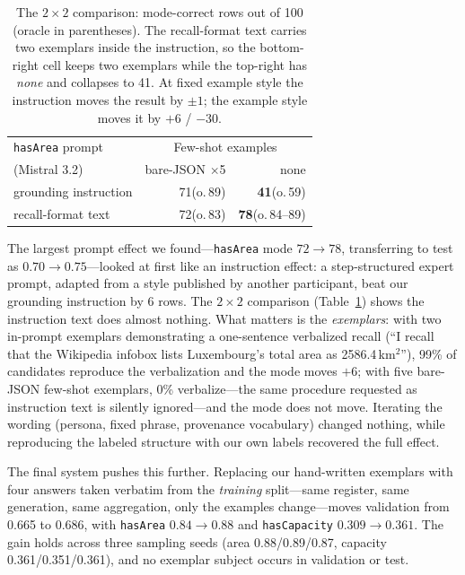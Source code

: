 \documentclass[11pt]{article}
\begin{document}
\begin{table}[t]
\centering
\footnotesize
\setlength{\tabcolsep}{4pt}
\begin{tabular}{lrr}
\toprule
\texttt{hasArea} prompt & \multicolumn{2}{c}{Few-shot examples} \\
(Mistral 3.2) & bare-JSON $\times$5 & none \\
\midrule
grounding instruction & 71\;(o.\,89) & \textbf{41}\;(o.\,59) \\
recall-format text & 72\;(o.\,83) & \textbf{78}\;(o.\,84--89) \\
\bottomrule
\end{tabular}
\caption{The $2{\times}2$ comparison: mode-correct rows out of 100
(oracle in parentheses). The recall-format text carries two exemplars
inside the instruction, so the bottom-right cell keeps two exemplars
while the top-right has \emph{none} and collapses to 41. At fixed example
style the instruction moves the result by $\pm1$; the example style moves
it by $+6$ / $-30$.}
\label{tab:grid}
\end{table}

The largest prompt effect we found---\texttt{hasArea} mode
$72\rightarrow78$, transferring to test as $0.70\rightarrow0.75$---looked
at first like an instruction effect: a step-structured expert prompt,
adapted from a style published by another participant, beat our grounding
instruction by 6 rows. The $2{\times}2$ comparison
(Table~\ref{tab:grid}) shows the instruction text does almost nothing.
What matters is the \emph{exemplars}: with two in-prompt
exemplars demonstrating a one-sentence verbalized recall (``I recall that
the Wikipedia infobox lists Luxembourg's total area as 2586.4\,km$^2$''),
99\% of candidates reproduce the verbalization and the mode moves $+6$;
with five bare-JSON few-shot exemplars, 0\% verbalize---the same
procedure requested as instruction text is silently ignored---and the
mode does not move. Iterating the wording (persona, fixed phrase,
provenance vocabulary) changed nothing, while reproducing the labeled
structure with our own labels recovered the full effect.

The final system pushes this further. Replacing our
hand-written exemplars with four answers taken verbatim from the
\emph{training} split---same register, same generation, same
aggregation, only the examples change---moves validation from 0.665 to
0.686, with \texttt{hasArea} $0.84\rightarrow0.88$ and
\texttt{hasCapacity} $0.309\rightarrow0.361$. The gain holds across three
sampling seeds (area 0.88/0.89/0.87, capacity 0.361/0.351/0.361), and no
exemplar subject occurs in validation or test.
\end{document}
